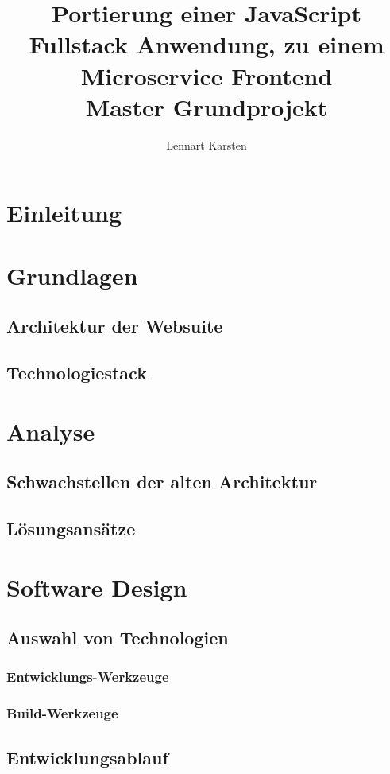 \documentclass[11pt,a4paper]{article}
\author{Lennart Karsten}
\title{Portierung einer JavaScript Fullstack Anwendung, zu einem Microservice Frontend\\
	\vspace{3mm}\large Master Grundprojekt
}
\date{}
\begin{document}
	\maketitle
	\tableofcontents
	\newpage
	
	
	\section{Einleitung}
	
	\section{Grundlagen}
	\subsection{Architektur der Websuite}
	\subsection{Technologiestack}
	
	\section{Analyse}
	\subsection{Schwachstellen der alten Architektur}
	\subsection{Lösungsansätze}
	
	\section{Software Design}
	\subsection{Auswahl von Technologien}
	\subsubsection{Entwicklungs-Werkzeuge}
	\subsubsection{Build-Werkzeuge}
	\subsection{Entwicklungsablauf}
\end{document}
